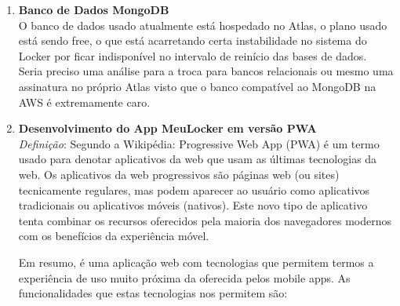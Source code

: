 \documentclass[
	12pt,				%
	openright,			%
	twoside,			%
	a4paper,			%
	english,			%
	french,				%
	spanish,			%
	brazil,				%
	]{abntex2}
\begin{document}
	\begin{enumerate}
		\item \textbf{Banco de Dados MongoDB} \\
			O banco de dados usado atualmente está hospedado no Atlas, o plano usado está sendo free, o que está acarretando certa instabilidade no sistema do Locker por ficar indisponível no intervalo de reinício das bases de dados. \\
			Seria preciso uma análise para a troca para bancos relacionais ou mesmo uma assinatura no próprio Atlas visto que o banco compatível ao MongoDB na AWS é extremamente caro.
		\item \textbf{Desenvolvimento do App MeuLocker em versão PWA} \\
			\textit{Definição}: Segundo a Wikipédia: Progressive Web App (PWA) é um termo usado para denotar aplicativos da web que usam as últimas tecnologias da web. Os aplicativos da web progressivos são páginas web (ou sites) tecnicamente regulares, mas podem aparecer ao usuário como aplicativos tradicionais ou aplicativos móveis (nativos). Este novo tipo de aplicativo tenta combinar os recursos oferecidos pela maioria dos navegadores modernos com os benefícios da experiência móvel.
			
			Em resumo, é uma aplicação web com tecnologias que permitem termos a experiência de uso muito próxima da oferecida pelos mobile apps. As funcionalidades que estas tecnologias nos permitem são:
			

\end{enumerate}
\end{document}

